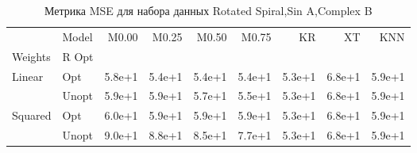 \begin{table}
\caption{Метрика MSE для набора данных Rotated Spiral,Sin A,Complex B}
\label{tab:MSE_Rotated Spiral,Sin A,Complex B}
\begin{tabular}{llrrrrrrr}
\toprule
 & Model & M0.00 & M0.25 & M0.50 & M0.75 & KR & XT & KNN \\
Weights & R Opt &  &  &  &  &  &  &  \\
\midrule
\multirow[t]{2}{*}{Linear} & Opt & 5.8e+1 & 5.4e+1 & 5.4e+1 & 5.4e+1 & 5.3e+1 & 6.8e+1 & 5.9e+1 \\
 & Unopt & 5.9e+1 & 5.9e+1 & 5.7e+1 & 5.5e+1 & 5.3e+1 & 6.8e+1 & 5.9e+1 \\

\multirow[t]{2}{*}{Squared} & Opt & 6.0e+1 & 5.9e+1 & 5.9e+1 & 5.9e+1 & 5.3e+1 & 6.8e+1 & 5.9e+1 \\
 & Unopt & 9.0e+1 & 8.8e+1 & 8.5e+1 & 7.7e+1 & 5.3e+1 & 6.8e+1 & 5.9e+1 \\

\bottomrule
\end{tabular}
\end{table}
